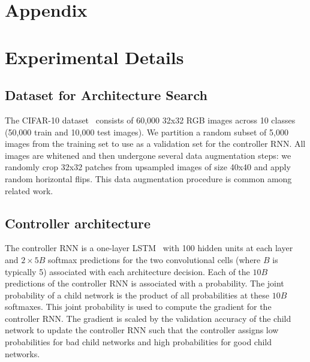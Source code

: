 
\newpage
\appendix
\section*{Appendix}
\section{Experimental Details}
\label{section:appendix-details}

\subsection{Dataset for Architecture Search}
The CIFAR-10 dataset~\cite{krizhevsky2009learning} consists of 60,000 32x32 RGB images across 10 classes (50,000 train and 10,000 test images).
We partition a random subset of 5,000 images from the training set to use as a validation set for the controller RNN. All images are whitened and then undergone several data augmentation steps: we randomly crop 32x32 patches from upsampled images of size 40x40 and apply random horizontal flips. This data augmentation procedure is common among related work.


\subsection{Controller architecture}
The controller RNN is a one-layer LSTM~\cite{lstm} with 100 hidden units at each layer and $2 \times 5B$ softmax predictions for the two convolutional cells (where $B$ is typically 5) associated with each architecture decision. Each of the $10B$ predictions of the controller RNN is associated with a probability. The joint probability of a child network is the product of all probabilities at these $10B$ softmaxes. This joint probability is used to compute the gradient for the controller RNN. The gradient is scaled by the validation accuracy of the child network to update the controller RNN such that the controller assigns low probabilities for bad child networks and high probabilities for good child networks. 

